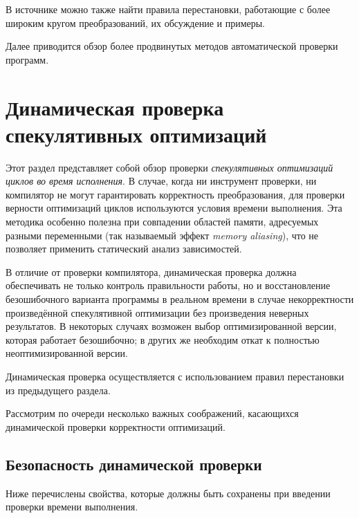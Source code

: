 В источнике \cite{ZPL00} можно также найти правила перестановки, работающие с более широким кругом преобразований, их обсуждение и примеры.

Далее приводится обзор более продвинутых методов автоматической проверки программ.

\section{Динамическая проверка спекулятивных оптимизаций}

Этот раздел представляет собой обзор проверки \emph{спекулятивных оптимизаций циклов во время исполнения}. В случае, когда ни инструмент проверки, ни компилятор не могут гарантировать корректность преобразования, для проверки верности оптимизаций циклов используются условия времени выполнения. Эта методика особенно полезна при совпадении областей памяти, адресуемых разными переменными (так называемый эффект \emph{memory aliasing}), что не позволяет применить статический анализ зависимостей.

В отличие от проверки компилятора, динамическая проверка должна обеспечивать не только контроль правильности работы, но и восстановление безошибочного варианта программы в реальном времени в случае некорректности произведённой спекулятивной оптимизации без произведения неверных результатов. В некоторых случаях возможен выбор оптимизированной версии, которая работает безошибочно; в других же необходим откат к полностью неоптимизированной версии.

Динамическая проверка осуществляется с использованием правил перестановки из предыдущего раздела.

Рассмотрим по очереди несколько важных соображений, касающихся динамической проверки корректности оптимизаций.

\subsection{Безопасность динамической проверки}

Ниже перечислены свойства, которые должны быть сохранены при введении проверки времени выполнения.

